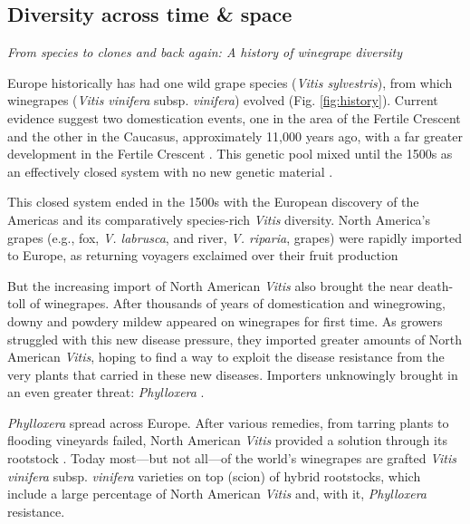 \documentclass[11pt]{article}
\begin{document}
\subsection{Diversity across time \& space}

\emph{From species to clones and back again: A history of winegrape diversity}

Europe historically has had one wild grape species (\emph{Vitis sylvestris}), from which winegrapes (\emph{Vitis vinifera} subsp. \emph{vinifera}) evolved (Fig.  \ref{fig:history}). Current evidence suggest two domestication events, one in the area of the Fertile Crescent and the other in the Caucasus, approximately 11,000 years ago, with a far greater development in the Fertile Crescent \citep{arroyo2006,mcgovern2017,riaz2018,dong2023}. This genetic pool mixed until the 1500s as an effectively closed system with no new genetic material \citep[e.g.,][]{dong2023}. 

This closed system ended in the 1500s with the European discovery of the Americas and its comparatively species-rich \emph{Vitis} diversity. North America's grapes (e.g., fox, \emph{V. labrusca}, and river, \emph{V. riparia}, grapes) were rapidly imported to Europe, as returning voyagers exclaimed over their fruit production \citep{campbell2005vitner}  %

But the increasing import of North American \emph{Vitis} also brought the near death-toll of winegrapes. After thousands of years of domestication and winegrowing, downy and powdery mildew appeared on winegrapes for first time. As growers struggled with this new disease pressure, they imported greater amounts of North American \emph{Vitis}, hoping to find a way to exploit the disease resistance from the very plants that carried in these new diseases. Importers unknowingly brought in an even greater threat: \emph{Phylloxera} \citep{galet1982,campbell2005vitner}. %

\emph{Phylloxera} spread across Europe. After various remedies, from tarring plants to flooding vineyards failed, North American  \emph{Vitis} provided a solution through its rootstock \citep{campbell2005vitner,galet2015}. Today most---but not all---of the world's winegrapes are grafted \emph{Vitis vinifera} subsp. \emph{vinifera} varieties on top (scion) of hybrid rootstocks, which include a large percentage of North American  \emph{Vitis} and, with it,  \emph{Phylloxera} resistance. 
\end{document}
